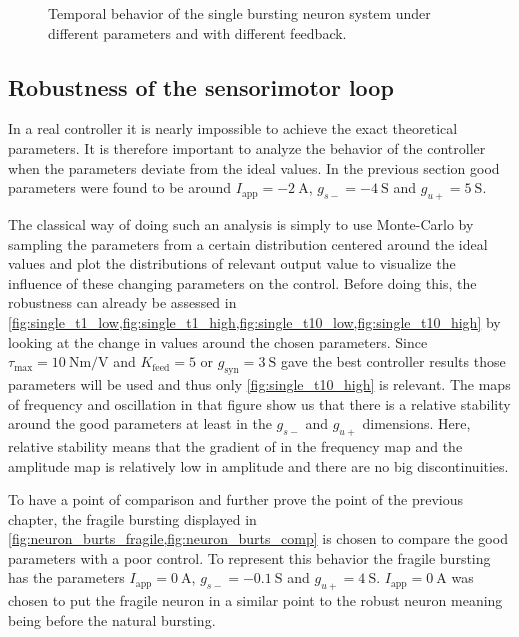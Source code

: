 \begin{figure}[!htbp]
    \centering
    \caption{Temporal behavior of the single bursting neuron system under different parameters and with different feedback.}
    \label{fig:single_control_traces}
\end{figure}

\subsection{Robustness of the sensorimotor loop}

In a real controller it is nearly impossible to achieve the exact theoretical parameters.
It is therefore important to analyze the behavior of the controller when the parameters deviate from the ideal values. 
In the previous section good parameters were found to be around $I_\text{app} = \qty{-2}{\ampere}$, $g_{s-} = \qty{-4}{\siemens}$ and $g_{u+} = \qty{5}{\siemens}$. 

The classical way of doing such an analysis is simply to use Monte-Carlo by sampling the parameters from a certain distribution centered around the ideal values and plot the distributions of relevant output value to visualize the influence of these changing parameters on the control. 
Before doing this, the robustness can already be assessed in \cref{fig:single_t1_low,fig:single_t1_high,fig:single_t10_low,fig:single_t10_high} by looking at the change in values around the chosen parameters. 
Since $\tau_\text{max}=\qty{10}{\newton\meter\per\volt}$ and $K_\text{feed} = 5$ or $g_{\text{syn}} = \qty{3}{\siemens}$ gave the best controller results those parameters will be used and thus only \cref{fig:single_t10_high} is relevant. 
The maps of frequency and oscillation in that figure show us that there is a relative stability around the good parameters at least in the $g_{s-}$ and $g_{u+}$ dimensions. 
Here, relative stability means that the gradient of in the frequency map and the amplitude map is relatively low in amplitude and there are no big discontinuities.

To have a point of comparison and further prove the point of the previous chapter, the fragile bursting displayed in \cref{fig:neuron_burts_fragile,fig:neuron_burts_comp} is chosen to compare the good parameters with a poor control. 
To represent this behavior the fragile bursting has the parameters $I_\text{app} = \qty{0}{\ampere}$, $g_{s-} = \qty{-0.1}{\siemens}$ and $g_{u+} = \qty{4}{\siemens}$. $I_\text{app} = \qty{0}{\ampere}$ was chosen to put the fragile neuron in a similar point to the robust neuron meaning being before the natural bursting.

